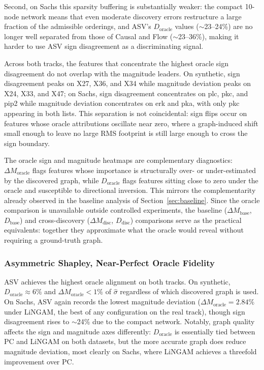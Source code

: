 \documentclass[12pt,a4paper,oneside]{article}
\begin{document}
Second, on Sachs this sparsity buffering is substantially weaker: the compact 10-node network means that even moderate discovery errors restructure a large fraction of the admissible orderings, and ASV's $D_{\text{oracle}}$ values ($\sim$23--24\%) are no longer well separated from those of Causal and Flow ($\sim$23--36\%), making it harder to use ASV sign disagreement as a discriminating signal.

Across both tracks, the features that concentrate the highest oracle sign disagreement do not overlap with the magnitude leaders. On synthetic, sign disagreement peaks on X27, X36, and X34 while magnitude deviation peaks on X24, X33, and X47; on Sachs, sign disagreement concentrates on plc, pkc, and pip2 while magnitude deviation concentrates on erk and pka, with only pkc appearing in both lists. This separation is not coincidental: sign flips occur on features whose oracle attributions oscillate near zero, where a graph-induced shift small enough to leave no large RMS footprint is still large enough to cross the sign boundary. 

The oracle sign and magnitude heatmaps are complementary diagnostics: $\Delta M_{\text{oracle}}$ flags features whose importance is structurally over- or under-estimated by the discovered graph, while $D_{\text{oracle}}$ flags features sitting close to zero under the oracle and susceptible to directional inversion. This mirrors the complementarity already observed in the baseline analysis of Section~\ref{sec:baseline}. Since the oracle comparison is unavailable outside controlled experiments, the baseline ($\Delta M_{\text{base}}$, $D_{\text{base}}$) and cross-discovery ($\Delta M_{\text{disc}}$, $D_{\text{disc}}$) comparisons serve as the practical equivalents: together they approximate what the oracle would reveal without requiring a ground-truth graph.

\subsubsection{Asymmetric Shapley, Near-Perfect Oracle Fidelity}

ASV achieves the highest oracle alignment on both tracks. On synthetic, $D_{\text{oracle}} \approx 6\%$ and $\Delta M_{\text{oracle}} < 1\%$ of $\hat{\sigma}$ regardless of which discovered graph is used. On Sachs, ASV again records the lowest magnitude deviation ($\Delta M_{\text{oracle}} = 2.84\%$ under LiNGAM, the best of any configuration on the real track), though sign disagreement rises to $\sim$24\% due to the compact network. Notably, graph quality affects the sign and magnitude axes differently: $D_{\text{oracle}}$ is essentially tied between PC and LiNGAM on both datasets, but the more accurate graph does reduce magnitude deviation, most clearly on Sachs, where LiNGAM achieves a threefold improvement over PC.
\end{document}
